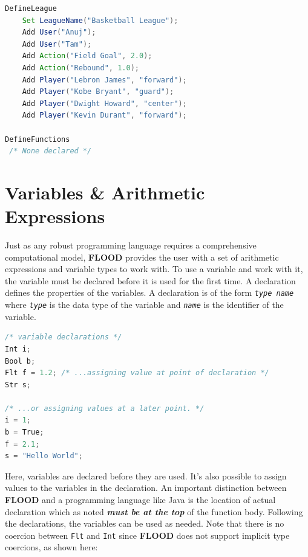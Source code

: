 \documentclass[12pt]{report}
\begin{document}
\begin{singlespace}
\begin{lstlisting}[language=Java,label=some-code,caption={Minimal FLOOD program to create a basektball fantasy league.}]
DefineLeague
	Set LeagueName("Basketball League");
	Add User("Anuj");
	Add User("Tam");
	Add Action("Field Goal", 2.0);
	Add Action("Rebound", 1.0);
	Add Player("Lebron James", "forward");
	Add Player("Kobe Bryant", "guard");
	Add Player("Dwight Howard", "center");
	Add Player("Kevin Durant", "forward");

DefineFunctions
 /* None declared */
\end{lstlisting}
\end{singlespace}

\section{Variables \& Arithmetic Expressions}

Just as any robust programming language requires a comprehensive computational model, \textbf{FLOOD} provides the user with a set of arithmetic expressions and variable types to work with. To use a variable and work with it, the variable must be declared before it is used for the first time. A declaration defines the properties of the variables. A declaration is of the form \textit{\texttt{type name}} where \textit{\texttt{type}} is the data type of the variable and \textit{\texttt{name}} is the identifier of the variable.

\begin{singlespace}
\begin{lstlisting}[language=Java,label=some-code,caption={Variable declarations.}]
/* variable declarations */
Int i;
Bool b;
Flt f = 1.2; /* ...assigning value at point of declaration */
Str s;

/* ...or assigning values at a later point. */
i = 1;
b = True;
f = 2.1;
s = "Hello World";
\end{lstlisting}
\end{singlespace}

Here, variables are declared before they are used. It's also possible to assign values to the variables in the declaration. An important distinction between \textbf{FLOOD} and a programming language like Java is the location of actual declaration which as noted \textit{\textbf{must be at the top}} of the function body. Following the declarations, the variables can be used as needed. Note that there is no coercion between \texttt{Flt} and \texttt{Int} since \textbf{FLOOD} does not support implicit type coercions, as shown here:
\end{document}
